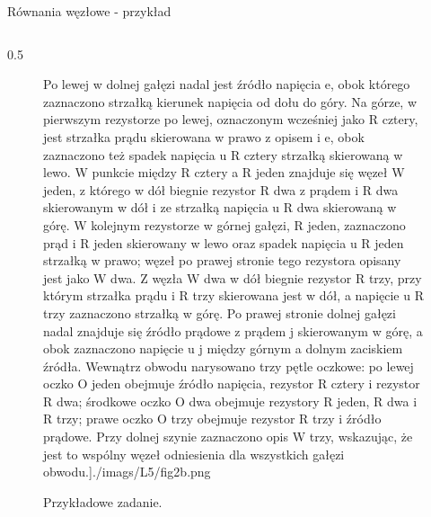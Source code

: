 \begin{frame}{Równania węzłowe - przykład}
\begin{columns}
\begin{column}{0.5\textwidth}
\begin{figure}
{							Po lewej w dolnej gałęzi nadal jest źródło napięcia e, obok którego zaznaczono strzałką kierunek napięcia od dołu do góry.
							Na górze, w pierwszym rezystorze po lewej, oznaczonym wcześniej jako R cztery, jest strzałka prądu skierowana w prawo z opisem i e, obok zaznaczono też spadek napięcia u R cztery strzałką skierowaną w lewo.
							W punkcie między R cztery a R jeden znajduje się węzeł W jeden, z którego w dół biegnie rezystor R dwa z prądem i R dwa skierowanym w dół i ze strzałką napięcia u R dwa skierowaną w górę.
							W kolejnym rezystorze w górnej gałęzi, R jeden, zaznaczono prąd i R jeden skierowany w lewo oraz spadek napięcia u R jeden strzałką w prawo; węzeł po prawej stronie tego rezystora opisany jest jako W dwa.
							Z węzła W dwa w dół biegnie rezystor R trzy, przy którym strzałka prądu i R trzy skierowana jest w dół, a napięcie u R trzy zaznaczono strzałką w górę.
							Po prawej stronie dolnej gałęzi nadal znajduje się źródło prądowe z prądem j skierowanym w górę, a obok zaznaczono napięcie u j między górnym a dolnym zaciskiem źródła.
							Wewnątrz obwodu narysowano trzy pętle oczkowe: po lewej oczko O jeden obejmuje źródło napięcia, rezystor R cztery i rezystor R dwa; środkowe oczko O dwa obejmuje rezystory R jeden, R dwa i R trzy; prawe oczko O trzy obejmuje rezystor R trzy i źródło prądowe.
							Przy dolnej szynie zaznaczono opis W trzy, wskazując, że jest to wspólny węzeł odniesienia dla wszystkich gałęzi obwodu.}]{./imags/L5/fig2b.png}
				\caption{Przykładowe zadanie.}
			\end{figure}
		\end{column}
	\end{columns}
\end{frame}

